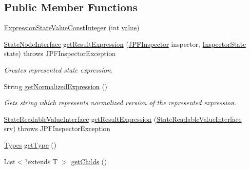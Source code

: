 \subsection*{Public Member Functions}
\begin{DoxyCompactItemize}
\item 
\hyperlink{classgov_1_1nasa_1_1jpf_1_1inspector_1_1server_1_1expression_1_1expressions_1_1_expression_state_value_const_integer_a6e44ac0cd7f6d79edb55e6ab27fb59b7}{Expression\+State\+Value\+Const\+Integer} (int \hyperlink{classgov_1_1nasa_1_1jpf_1_1inspector_1_1server_1_1expression_1_1expressions_1_1_expression_state_value_const_integer_a17498ef8a0993ee14ae829c5aaf420b6}{value})
\item 
\hyperlink{interfacegov_1_1nasa_1_1jpf_1_1inspector_1_1server_1_1programstate_1_1_state_node_interface}{State\+Node\+Interface} \hyperlink{classgov_1_1nasa_1_1jpf_1_1inspector_1_1server_1_1expression_1_1expressions_1_1_expression_state_value_const_integer_a657bcf68c92b457f8140f9e2d11fa022}{get\+Result\+Expression} (\hyperlink{classgov_1_1nasa_1_1jpf_1_1inspector_1_1server_1_1jpf_1_1_j_p_f_inspector}{J\+P\+F\+Inspector} inspector, \hyperlink{interfacegov_1_1nasa_1_1jpf_1_1inspector_1_1server_1_1expression_1_1_inspector_state}{Inspector\+State} state)  throws J\+P\+F\+Inspector\+Exception 
\begin{DoxyCompactList}\small\item\em Creates represented state expression. \end{DoxyCompactList}\item 
String \hyperlink{classgov_1_1nasa_1_1jpf_1_1inspector_1_1server_1_1expression_1_1expressions_1_1_expression_state_value_const_integer_a49ccad06fcf3443c4f1a0306a007f320}{get\+Normalized\+Expression} ()
\begin{DoxyCompactList}\small\item\em Gets string which represents normalized version of the represented expression. \end{DoxyCompactList}\item 
\hyperlink{interfacegov_1_1nasa_1_1jpf_1_1inspector_1_1server_1_1programstate_1_1_state_readable_value_interface}{State\+Readable\+Value\+Interface} \hyperlink{classgov_1_1nasa_1_1jpf_1_1inspector_1_1server_1_1expression_1_1expressions_1_1_expression_state_value_const_a11bde76b1048dc08cc72bb596c357c7c}{get\+Result\+Expression} (\hyperlink{interfacegov_1_1nasa_1_1jpf_1_1inspector_1_1server_1_1programstate_1_1_state_readable_value_interface}{State\+Readable\+Value\+Interface} srv)  throws J\+P\+F\+Inspector\+Exception 
\item 
\hyperlink{enumgov_1_1nasa_1_1jpf_1_1inspector_1_1server_1_1expression_1_1_types}{Types} \hyperlink{classgov_1_1nasa_1_1jpf_1_1inspector_1_1server_1_1expression_1_1expressions_1_1_expression_state_value_a9317f49f60c166a2f46f90702e75f22e}{get\+Type} ()
\item 
List$<$?extends T $>$ \hyperlink{classgov_1_1nasa_1_1jpf_1_1inspector_1_1server_1_1expression_1_1_expression_state_unary_operator_ad010bcb9c4e2eb584321b5ceba8e1682}{get\+Childs} ()
\end{DoxyCompactItemize}
